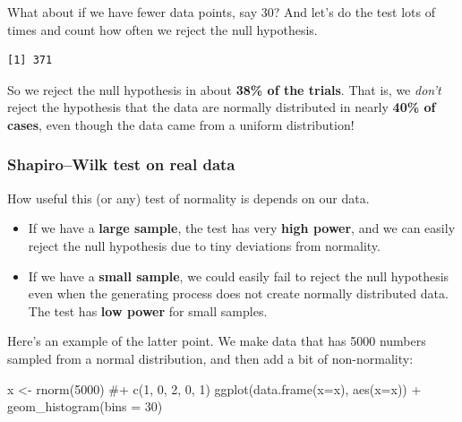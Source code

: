 \documentclass[
  letterpaper,
  8pt,
  a4paper]{book}
\newenvironment{Shaded}{\begin{snugshade}}{\end{snugshade}}
\newcommand{\AttributeTok}[1]{\textcolor[rgb]{0.40,0.45,0.13}{#1}}
\newcommand{\CommentTok}[1]{\textcolor[rgb]{0.37,0.37,0.37}{#1}}
\newcommand{\DecValTok}[1]{\textcolor[rgb]{0.68,0.00,0.00}{#1}}
\newcommand{\FloatTok}[1]{\textcolor[rgb]{0.68,0.00,0.00}{#1}}
\newcommand{\FunctionTok}[1]{\textcolor[rgb]{0.28,0.35,0.67}{#1}}
\newcommand{\NormalTok}[1]{\textcolor[rgb]{0.00,0.23,0.31}{#1}}
\newcommand{\OtherTok}[1]{\textcolor[rgb]{0.00,0.23,0.31}{#1}}
\newcommand{\SpecialCharTok}[1]{\textcolor[rgb]{0.37,0.37,0.37}{#1}}
\providecommand{\tightlist}{%
  \setlength{\itemsep}{0pt}\setlength{\parskip}{0pt}}
\begin{document}
What about if we have fewer data points, say 30? And let's do the test
lots of times and count how often we reject the null hypothesis.

\begin{Shaded}
\end{Shaded}

\begin{verbatim}
[1] 371
\end{verbatim}

So we reject the null hypothesis in about \textbf{38\% of the trials}.
That is, we \emph{don't} reject the hypothesis that the data are
normally distributed in nearly \textbf{40\% of cases}, even though the
data came from a uniform distribution!

\subsubsection*{Shapiro--Wilk test on real
data}\label{shapirowilk-test-on-real-data}

How useful this (or any) test of normality is depends on our data.

\begin{itemize}
\tightlist
\item
  If we have a \textbf{large sample}, the test has very \textbf{high
  power}, and we can easily reject the null hypothesis due to tiny
  deviations from normality.
\item
  If we have a \textbf{small sample}, we could easily fail to reject the
  null hypothesis even when the generating process does not create
  normally distributed data. The test has \textbf{low power} for small
  samples.
\end{itemize}

Here's an example of the latter point. We make data that has 5000
numbers sampled from a normal distribution, and then add a bit of
non-normality:

\begin{Shaded}
\begin{Highlighting}[]
\NormalTok{x }\OtherTok{\textless{}{-}} \FunctionTok{rnorm}\NormalTok{(}\DecValTok{5000}\NormalTok{) }\CommentTok{\#+ c(1, 0, 2, 0, 1)}
\FunctionTok{ggplot}\NormalTok{(}\FunctionTok{data.frame}\NormalTok{(}\AttributeTok{x=}\NormalTok{x), }\FunctionTok{aes}\NormalTok{(}\AttributeTok{x=}\NormalTok{x)) }\SpecialCharTok{+}
  \FunctionTok{geom\_histogram}\NormalTok{(}\AttributeTok{bins =} \DecValTok{30}\NormalTok{)}
\end{Highlighting}
\end{Shaded}
\end{document}
